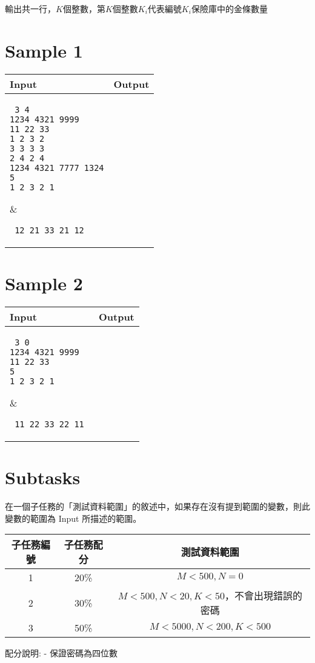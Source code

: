 \documentclass[11pt,a4paper]{article}
\begin{document}
輸出共一行，$K$個整數，第$K$個整數$K_i$代表編號$K_i$保險庫中的金條數量

\newpage
\section*{Sample 1}
\begin{longtable}[!h]{|p{}|p{}|}
\hline
\textbf {Input}	& \textbf {Output} \\
\hline
\parbox[t]{0.5\textwidth} %
{ \tt
3 4\\
1234 4321 9999\\
11 22 33 \\
1 2 3 2\\
3 3 3 3\\
2 4 2 4\\
1234 4321 7777 1324\\
5\\
1 2 3 2 1\\

} &
\parbox[t]{0.5\textwidth}
{ \tt
12 21 33 21 12
} \\
\hline
\end{longtable}

\section*{Sample 2}
\begin{longtable}[!h]{|p{}|p{}|}
\hline
\textbf {Input}	& \textbf {Output} \\
\hline
\parbox[t]{0.5\textwidth} %
{ \tt
3 0\\
1234 4321 9999\\
11 22 33 \\
5\\
1 2 3 2 1\\


} &
\parbox[t]{0.5\textwidth}
{ \tt
11 22 33 22 11
} \\
\hline
\end{longtable}

\section*{Subtasks}

在一個子任務的「測試資料範圍」的敘述中，如果存在沒有提到範圍的變數，則此變數的範圍為 Input 所描述的範圍。

\begin{center}
 \begin{tabular}{||c c c||} 
 \hline
 子任務編號 & 子任務配分 & 測試資料範圍 \\  
 \hline
 \hline
 1 & 20\% & $M<500, N=0$ \\ 
 \hline
 2 & 30\% & $M<500, N<20, K<50$，不會出現錯誤的密碼\\
 \hline 
 3 & 50\% & $M<5000, N<200, K<500$ \\
 \hline

\end{tabular}
\end{center}

配分說明:
- 保證密碼為四位數
\end{document}
